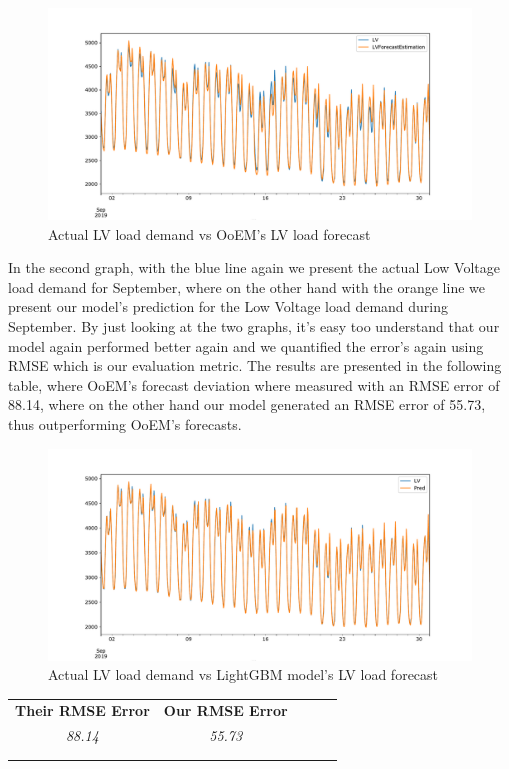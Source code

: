 \begin{figure}[h!]
\centering
\includegraphics[width=1\linewidth]{project/1.pdf}
\caption{Actual LV load demand vs OoEM’s LV load forecast}
\label{fig:felix}
\end{figure}
In the second graph, with the blue line again we present the actual Low Voltage load demand for September, where on the other hand with the orange line we present our model's prediction for the Low Voltage load demand during September. By just looking at the two graphs, it's easy too understand that our model again performed better again and we quantified the error's again using RMSE which is our evaluation metric. The results are presented in the following table, where OoEM's forecast deviation where measured with an RMSE error of 88.14, where on the other hand our model generated an RMSE error of 55.73, thus outperforming OoEM's forecasts.
\begin{figure}[h!]
\centering
\includegraphics[width=1\linewidth]{project/2.pdf}
\caption{Actual LV load demand vs LightGBM model's LV load forecast}
\label{fig:felix}
\end{figure}
\begin{table}[h!]
\centering
\begin{tabular}{lllll}
\cline{1-2}
\multicolumn{1}{|l|}{\textbf{Their RMSE Error}} & \multicolumn{1}{l|}{\textbf{Our RMSE Error}} &  &  &  \\ \cline{1-2}
\multicolumn{1}{|c|}{\textit{88.14}} & \multicolumn{1}{c|}{\textit{55.73}} &  &  &  \\ \cline{1-2}
                                &                                &  &  &  \\
                                &                                &  &  & 
\end{tabular}
\end{table}
